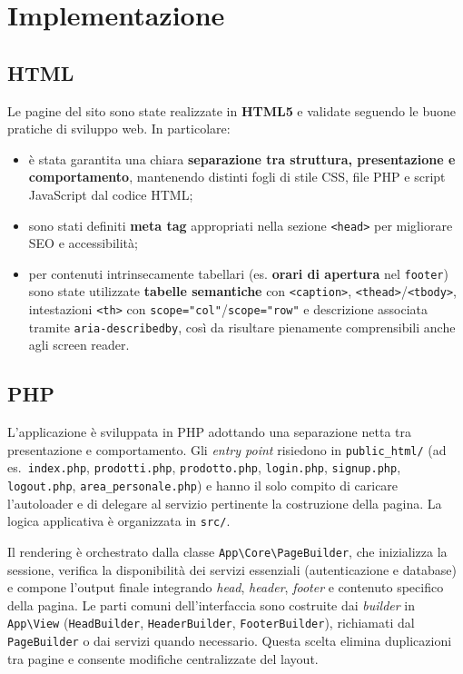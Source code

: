 \section{Implementazione}

\subsection{HTML}
Le pagine del sito sono state realizzate in \textbf{HTML5} e validate seguendo le buone pratiche di sviluppo web. In particolare:
\begin{itemize}
  \item è stata garantita una chiara \textbf{separazione tra struttura, presentazione e comportamento}, mantenendo distinti fogli di stile CSS, file PHP e script JavaScript dal codice HTML;
  \item sono stati definiti \textbf{meta tag} appropriati nella sezione \texttt{<head>} per migliorare SEO e accessibilità;
  \item per contenuti intrinsecamente tabellari (es. \textbf{orari di apertura} nel \texttt{footer}) sono state utilizzate \textbf{tabelle semantiche} con \texttt{<caption>}, \texttt{<thead>}/\texttt{<tbody>}, intestazioni \texttt{<th>} con \verb|scope="col"|/\verb|scope="row"| e descrizione associata tramite \verb|aria-describedby|, così da risultare pienamente comprensibili anche agli screen reader.
\end{itemize}


\subsection{PHP}

L'applicazione è sviluppata in PHP adottando una separazione netta tra presentazione e comportamento. Gli \emph{entry point} risiedono in \texttt{public\_html/} (ad es.\ \texttt{index.php}, \texttt{prodotti.php}, \texttt{prodotto.php}, \texttt{login.php}, \texttt{signup.php}, \texttt{logout.php}, \texttt{area\_personale.php}) e hanno il solo compito di caricare l'autoloader e di delegare al servizio pertinente la costruzione della pagina. La logica applicativa è organizzata in \texttt{src/}.

Il rendering è orchestrato dalla classe \texttt{App\textbackslash Core\textbackslash PageBuilder}, che inizializza la sessione, verifica la disponibilità dei servizi essenziali (autenticazione e database) e compone l'output finale integrando \emph{head}, \emph{header}, \emph{footer} e contenuto specifico della pagina. Le parti comuni dell'interfaccia sono costruite dai \emph{builder} in \texttt{App\textbackslash View} (\texttt{HeadBuilder}, \texttt{HeaderBuilder}, \texttt{FooterBuilder}), richiamati dal \texttt{PageBuilder} o dai servizi quando necessario. Questa scelta elimina duplicazioni tra pagine e consente modifiche centralizzate del layout.
 

